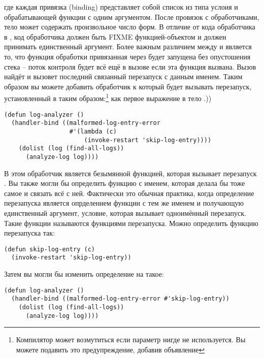 где каждая привязка (binding) представляет собой список из типа услоия и обрабатывающей
функции с одним аргументом. После провязок с обработчиками, тело  может
содержать произвольное число форм. В отличие от кода обработчика в ,
код обработчика должен быть FIXME функцией-объектом и должен принимать единственный
аргумент. Более важным различием между  и  является
то, что функция обработки привязанная через  будет запущена без
опустошения стека -- поток контроля будет всё ещё в вызове  если эта
функция вызвана. Вызов  найдёт и вызовет последний связанный
перезапуск с данным именем. Таким образом вы можете добавить обработчик к
 который будет вызывать  перезапуск, установленный
в  таким образом:\footnote{Компилятор может возмутиться если параметр
  нигде не используется. Вы можете подавить это предупреждение, добавив объявление
  } как первое выражение в тело .))

\begin{lstlisting}
(defun log-analyzer ()
  (handler-bind ((malformed-log-entry-error
                  #'(lambda (c)
                      (invoke-restart 'skip-log-entry))))
    (dolist (log (find-all-logs))
      (analyze-log log))))
\end{lstlisting}

В этом  обработчик является безымянной функцией, которая вызывает
перезапуск . Вы также могли бы определить функцию с именем, которая
делала бы тоже самое и связать всё с ней. Фактически это обычная практика, когда
определение перезапуска является опрделением функции с тем же именем и получающую
единственный аргумент, условие, которая вызывает одноимённый перезапуск. Такие функции
называются функциями перезапуска. Можно определить функцию перезапуска
 так:

\begin{lstlisting}
(defun skip-log-entry (c)
  (invoke-restart 'skip-log-entry))
\end{lstlisting}

Затем вы могли бы изменить определение  на такое:

\begin{lstlisting}
(defun log-analyzer ()
  (handler-bind ((malformed-log-entry-error #'skip-log-entry))
    (dolist (log (find-all-logs))
      (analyze-log log))))
\end{lstlisting}

